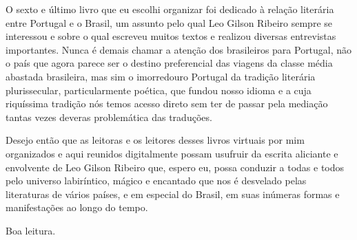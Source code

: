 \documentclass[
  a4paper,
  oneside]{scrbook}
\begin{document}
O sexto e último livro que eu escolhi organizar foi dedicado à relação
literária entre Portugal e o Brasil, um assunto pelo qual Leo Gilson
Ribeiro sempre se interessou e sobre o qual escreveu muitos textos e
realizou diversas entrevistas importantes. Nunca é demais chamar a
atenção dos brasileiros para Portugal, não o país que agora parece ser o
destino preferencial das viagens da classe média abastada brasileira,
mas sim o imorredouro Portugal da tradição literária plurissecular,
particularmente poética, que fundou nosso idioma e a cuja riquíssima
tradição nós temos acesso direto sem ter de passar pela mediação tantas
vezes deveras problemática das traduções.

Desejo então que as leitoras e os leitores desses livros virtuais por
mim organizados e aqui reunidos digitalmente possam usufruir da escrita
aliciante e envolvente de Leo Gilson Ribeiro que, espero eu, possa
conduzir a todas e todos pelo universo labiríntico, mágico e encantado
que nos é desvelado pelas literaturas de vários países, e em especial do
Brasil, em suas inúmeras formas e manifestações ao longo do tempo.

Boa leitura.
\end{document}
